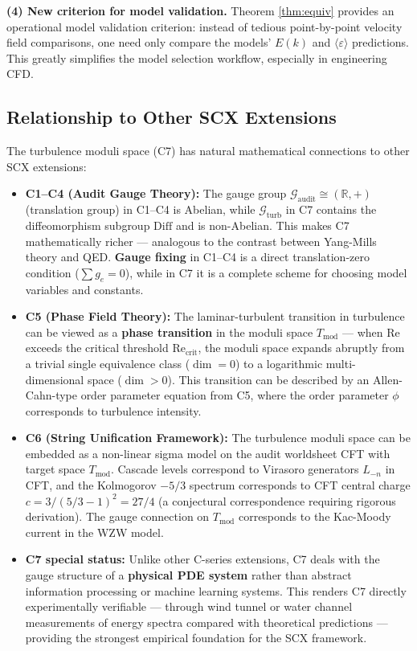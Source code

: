 \documentclass[12pt,a4paper]{article}
\theoremstyle{plain}
\theoremstyle{definition}
\theoremstyle{remark}
\newcommand{\R}{\mathbb{R}}
\newcommand{\G}{\mathcal{G}}
\newcommand{\Tmod}{T_{\text{mod}}}
\newcommand{\ReNum}{\mathrm{Re}}
\newcommand{\eps}{\varepsilon}
\newcommand{\avg}[1]{\langle #1 \rangle}
\newcommand{\Diff}{\mathrm{Diff}}
\begin{document}
\textbf{(4) New criterion for model validation.} Theorem \ref{thm:equiv} provides an operational model validation criterion: instead of tedious point-by-point velocity field comparisons, one need only compare the models' $E(k)$ and $\avg{\eps}$ predictions. This greatly simplifies the model selection workflow, especially in engineering CFD.

\subsection{Relationship to Other SCX Extensions}

The turbulence moduli space (C7) has natural mathematical connections to other SCX extensions:

\begin{itemize}
    \item \textbf{C1--C4 (Audit Gauge Theory):} The gauge group $\G_{\text{audit}} \cong (\R,+)$ (translation group) in C1--C4 is Abelian, while $\G_{\text{turb}}$ in C7 contains the diffeomorphism subgroup $\Diff$ and is non-Abelian. This makes C7 mathematically richer --- analogous to the contrast between Yang-Mills theory and QED. \textbf{Gauge fixing} in C1--C4 is a direct translation-zero condition ($\sum g_e = 0$), while in C7 it is a complete scheme for choosing model variables and constants.

    \item \textbf{C5 (Phase Field Theory):} The laminar-turbulent transition in turbulence can be viewed as a \textbf{phase transition} in the moduli space $\Tmod$ --- when $\ReNum$ exceeds the critical threshold $\ReNum_{\text{crit}}$, the moduli space expands abruptly from a trivial single equivalence class ($\dim=0$) to a logarithmic multi-dimensional space ($\dim>0$). This transition can be described by an Allen-Cahn-type order parameter equation from C5, where the order parameter $\phi$ corresponds to turbulence intensity.

    \item \textbf{C6 (String Unification Framework):} The turbulence moduli space can be embedded as a non-linear sigma model on the audit worldsheet CFT with target space $\Tmod$. Cascade levels correspond to Virasoro generators $L_{-n}$ in CFT, and the Kolmogorov $-5/3$ spectrum corresponds to CFT central charge $c = 3/(5/3-1)^2 = 27/4$ (a conjectural correspondence requiring rigorous derivation). The gauge connection on $\Tmod$ corresponds to the Kac-Moody current in the WZW model.

    \item \textbf{C7 special status:} Unlike other C-series extensions, C7 deals with the gauge structure of a \textbf{physical PDE system} rather than abstract information processing or machine learning systems. This renders C7 directly experimentally verifiable --- through wind tunnel or water channel measurements of energy spectra compared with theoretical predictions --- providing the strongest empirical foundation for the SCX framework.
\end{itemize}
\end{document}
